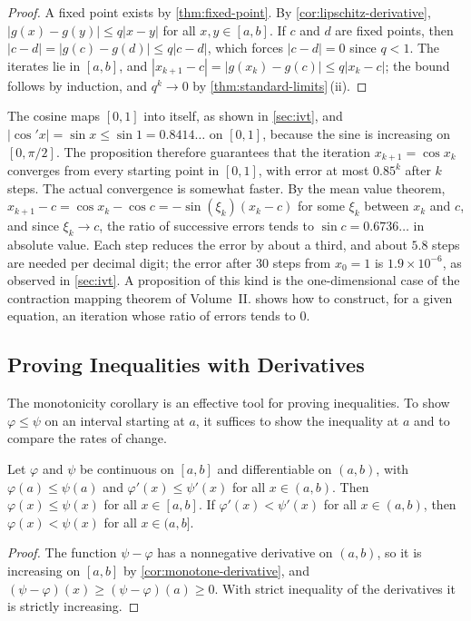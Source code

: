 \begin{proof}
A fixed point exists by \cref{thm:fixed-point}. By \cref{cor:lipschitz-derivative}, $|g(x)-g(y)|\le q|x-y|$ for all $x,y\in[a,b]$. If $c$ and $d$ are fixed points, then $|c-d|=|g(c)-g(d)|\le q|c-d|$, which forces $|c-d|=0$ since $q<1$. The iterates lie in $[a,b]$, and $|x_{k+1}-c|=|g(x_k)-g(c)|\le q|x_k-c|$; the bound follows by induction, and $q^k\to0$ by \cref{thm:standard-limits}\,(ii).
\end{proof}

The cosine maps $[0,1]$ into itself, as shown in \cref{sec:ivt}, and $|\cos'x|=\sin x\le\sin1=0.8414\ldots$ on $[0,1]$, because the sine is increasing on $[0,\pi/2]$. The proposition therefore guarantees that the iteration $x_{k+1}=\cos x_k$ converges from every starting point in $[0,1]$, with error at most $0.85^k$ after $k$ steps. The actual convergence is somewhat faster. By the mean value theorem, $x_{k+1}-c=\cos x_k-\cos c=-\sin(\xi_k)(x_k-c)$ for some $\xi_k$ between $x_k$ and $c$, and since $\xi_k\to c$, the ratio of successive errors tends to $\sin c=0.6736\ldots$ in absolute value. Each step reduces the error by about a third, and about $5.8$ steps are needed per decimal digit; the error after $30$ steps from $x_0=1$ is $1.9\times10^{-6}$, as observed in \cref{sec:ivt}. A proposition of this kind is the one-dimensional case of the contraction mapping theorem of Volume~II.  shows how to construct, for a given equation, an iteration whose ratio of errors tends to $0$.

\subsection{Proving Inequalities with Derivatives}

The monotonicity corollary is an effective tool for proving inequalities. To show $\varphi\le\psi$ on an interval starting at $a$, it suffices to show the inequality at $a$ and to compare the rates of change.

\begin{lemma}[Comparison]
\label{lem:comparison}
Let $\varphi$ and $\psi$ be continuous on $[a,b]$ and differentiable on $(a,b)$, with $\varphi(a)\le\psi(a)$ and $\varphi'(x)\le\psi'(x)$ for all $x\in(a,b)$. Then $\varphi(x)\le\psi(x)$ for all $x\in[a,b]$. If $\varphi'(x)<\psi'(x)$ for all $x\in(a,b)$, then $\varphi(x)<\psi(x)$ for all $x\in(a,b]$.
\end{lemma}

\begin{proof}
The function $\psi-\varphi$ has a nonnegative derivative on $(a,b)$, so it is increasing on $[a,b]$ by \cref{cor:monotone-derivative}, and $(\psi-\varphi)(x)\ge(\psi-\varphi)(a)\ge0$. With strict inequality of the derivatives it is strictly increasing.
\end{proof}

